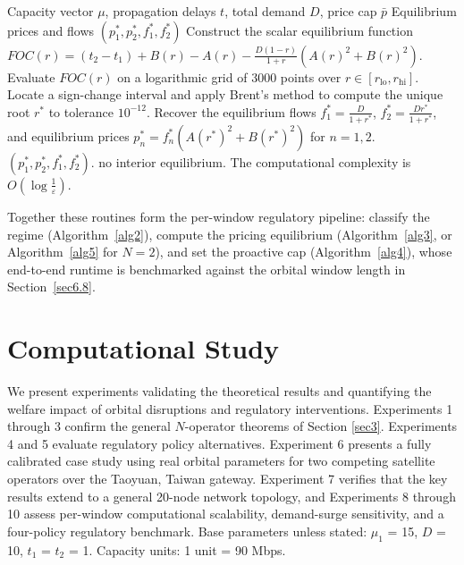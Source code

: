 \documentclass[review,3p,authoryear]{elsarticle}
\begin{document}
\begin{algorithm}[!h]
\caption{Interior Nash Equilibrium Solver for Two Operators}
\label{alg5}
\begin{algorithmic}[1]
\Require Capacity vector ${\mu}$, propagation delays $t$, total demand $D$, price cap $\bar{p}$
\Ensure Equilibrium prices and flows $\left(p_{1}^{*}, p_{2}^{*}, f_{1}^{*}, f_{2}^{*}\right)$
\State Construct the scalar equilibrium function
\Statex $FOC(r)=(t_{2}-t_{1})+B(r)-A(r)-\frac{D(1-r)}{1+r}\left(A(r)^{2}+B(r)^{2}\right)$.
\State Evaluate $FOC(r)$ on a logarithmic grid of 3000 points over $r {\in} [r_{\mathrm{lo}},r_{\mathrm{hi}}]$.
\State Locate a sign-change interval and apply Brent's method to compute the unique root $r^{*}$ to tolerance $10^{-12}$.
\State Recover the equilibrium flows $f_{1}^{*}=\frac{D}{1+r^{*}}$, $f_{2}^{*}=\frac{Dr^{*}}{1+r^{*}}$, and equilibrium prices $p_{n}^{*}=f_{n}^{*}\left(A(r^{*})^{2}+B(r^{*})^{2}\right)$ for $n=1,2$.
    \State \Return $\left(p_{1}^{*},p_{2}^{*},f_{1}^{*},f_{2}^{*}\right)$.
\Else
    \State \Return no interior equilibrium.
\EndIf
\Statex The computational complexity is $O\!\left(\log\frac{1}{{\varepsilon}}\right)$.
\end{algorithmic}
\end{algorithm}

Together these routines form the per-window regulatory pipeline: classify the regime (Algorithm~\ref{alg2}), compute the pricing equilibrium (Algorithm~\ref{alg3}, or Algorithm~\ref{alg5} for $N=2$), and set the proactive cap (Algorithm~\ref{alg4}), whose end-to-end runtime is benchmarked against the orbital window length in Section~\ref{sec6.8}.
\FloatBarrier
\section{Computational Study}
\label{sec6}

We present experiments validating the theoretical results and quantifying the welfare impact of orbital disruptions and regulatory interventions. Experiments 1 through 3 confirm the general $N$-operator theorems of Section \ref{sec3}. Experiments 4 and 5 evaluate regulatory policy alternatives. Experiment 6 presents a fully calibrated case study using real orbital parameters for two competing satellite operators over the Taoyuan, Taiwan gateway. Experiment 7 verifies that the key results extend to a general 20-node network topology, and Experiments 8 through 10 assess per-window computational scalability, demand-surge sensitivity, and a four-policy regulatory benchmark. Base parameters unless stated: ${\mu}_{1}$ = 15, $D$ = 10, $t_{1}$ = $t_{2}$ = 1. Capacity units: 1 unit = 90 Mbps.
\end{document}
